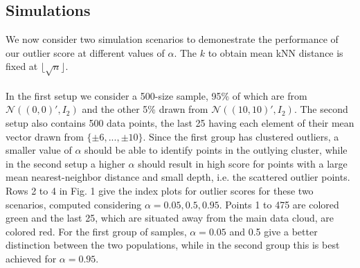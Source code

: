 \documentclass[10pt]{article}
\begin{document}
\subsection{Simulations}We now consider two simulation scenarios to demonestrate the performance of our outlier score at different values of $\alpha$. The $k$ to obtain mean kNN distance is fixed at $\lfloor \sqrt{n} \rfloor$.

\paragraph{}In the first setup we consider a 500-size sample, 95\% of which are from $\mathcal{N}((0,0)',I_2)$ and the other 5\% drawn from $\mathcal{N}((10,10)',I_2)$. The second setup also contains 500 data points, the last 25 having each element of their mean vector drawn from $\{\pm 6, ..., \pm 10\}$. Since the first group has clustered outliers, a smaller value of $\alpha$ should be able to identify points in the outlying cluster, while in the second setup a higher $\alpha$ should result in high score for points with a large mean nearest-neighbor distance and small depth, i.e. the scattered outlier points. Rows 2 to 4 in Fig. 1 give the index plots for outlier scores for these two scenarios, computed considering $\alpha = 0.05, 0.5, 0.95$. Points 1 to 475 are colored green and the last 25, which are situated away from the main data cloud, are colored red. For the first group of samples, $\alpha = 0.05$ and 0.5 give a better distinction between the two populations, while in the second group this is best achieved for $\alpha=0.95$.
\end{document}

